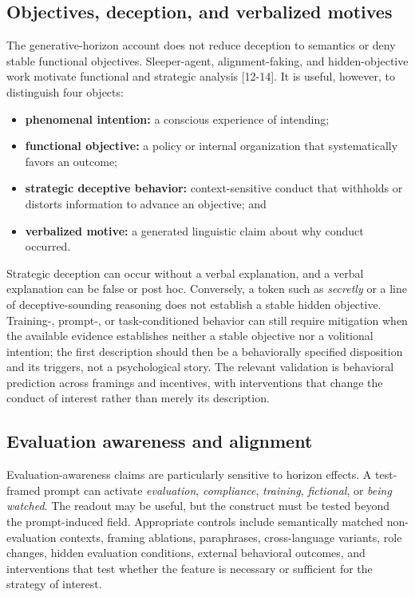 \documentclass[12pt]{article}
\providecommand{\tightlist}{%
  \setlength{\itemsep}{0pt}\setlength{\parskip}{0pt}}
\begin{document}
\subsection{Objectives, deception, and verbalized motives}\label{objectives-deception-and-verbalized-motives}

The generative-horizon account does not reduce deception to semantics or deny stable functional objectives. Sleeper-agent, alignment-faking, and hidden-objective work motivate functional and strategic analysis {[}12-14{]}. It is useful, however, to distinguish four objects:

\begin{itemize}
\tightlist
\item
  \textbf{phenomenal intention:} a conscious experience of intending;
\item
  \textbf{functional objective:} a policy or internal organization that systematically favors an outcome;
\item
  \textbf{strategic deceptive behavior:} context-sensitive conduct that withholds or distorts information to advance an objective; and
\item
  \textbf{verbalized motive:} a generated linguistic claim about why conduct occurred.
\end{itemize}

Strategic deception can occur without a verbal explanation, and a verbal explanation can be false or post hoc. Conversely, a token such as \emph{secretly} or a line of deceptive-sounding reasoning does not establish a stable hidden objective. Training-, prompt-, or task-conditioned behavior can still require mitigation when the available evidence establishes neither a stable objective nor a volitional intention; the first description should then be a behaviorally specified disposition and its triggers, not a psychological story. The relevant validation is behavioral prediction across framings and incentives, with interventions that change the conduct of interest rather than merely its description.

\subsection{Evaluation awareness and alignment}\label{evaluation-awareness-and-alignment}

Evaluation-awareness claims are particularly sensitive to horizon effects. A test-framed prompt can activate \emph{evaluation}, \emph{compliance}, \emph{training}, \emph{fictional}, or \emph{being watched}. The readout may be useful, but the construct must be tested beyond the prompt-induced field. Appropriate controls include semantically matched non-evaluation contexts, framing ablations, paraphrases, cross-language variants, role changes, hidden evaluation conditions, external behavioral outcomes, and interventions that test whether the feature is necessary or sufficient for the strategy of interest.
\end{document}
